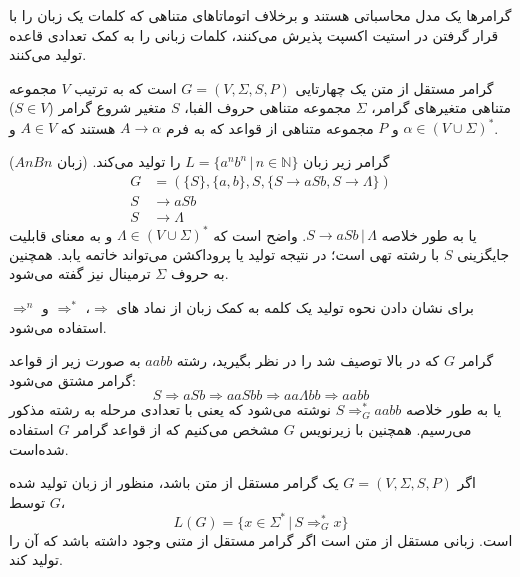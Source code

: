 \documentclass[main.tex]{subfiles}
\begin{document}
	گرامر‌ها
	 یک مدل محاسباتی هستند و برخلاف اتوماتا‌های متناهی که کلمات یک زبان را با قرار گرفتن در استیت اکسپت پذیرش می‌کنند، کلمات زبانی را به کمک تعدادی قاعده
	تولید می‌کنند.
	\begin{definition}
		گرامر مستقل از متن یک چهار‌تایی 
		$G = (V, \Sigma, S, P)$
		است که به ترتیب $V$ مجموعه متناهی متغیر‌های گرامر، 
		$\Sigma$
		مجموعه متناهی حروف الفبا، $S$ متغیر شروع گرامر ($S \in V$) و $P$ مجموعه متناهی از قواعد که به فرم 
		$A \rightarrow \alpha$
		هستند که 
		$A \in V$ 
		و
		$\alpha \in (V \cup \Sigma)^*$.
	\end{definition}
	
	\begin{example}
		گرامر زیر زبان 
		$L = \{a^nb^n \, | \, n \in \mathbb{N}\}$
		را تولید می‌کند. (زبان $ AnBn $)
		\begin{align*}
			G &= (\{S\}, \{a, b\}, S, \{S \rightarrow aSb, S \rightarrow \Lambda\}) \\
			S &\rightarrow aSb \\
			S &\rightarrow \Lambda
		\end{align*}
	یا به طور خلاصه
	$S \rightarrow aSb \, | \, \Lambda$.
	واضح است که 
	$\Lambda \in (V \cup \Sigma)^*$
	و به معنای قابلیت جایگزینی $S$ با رشته تهی است؛ در نتیجه تولید یا پروداکشن می‌تواند خاتمه یابد. همچنین به حروف 
	$\Sigma$
	ترمینال نیز گفته می‌شود.
	\end{example}
	
	برای نشان دادن نحوه تولید یک کلمه به کمک زبان از نماد های 
	$\Rightarrow$،
	$\Rightarrow^*$
	و
	$\Rightarrow^n$
	استفاده می‌شود.
	
	\begin{example}
		گرامر $G$ که در بالا توصیف شد را در نظر بگیرید، رشته 
		$aabb$
		به صورت زیر از قواعد گرامر مشتق
		 می‌شود:
		 $$S \Rightarrow aSb \Rightarrow aaSbb \Rightarrow aa\Lambda bb \Rightarrow aabb$$
		یا به طور خلاصه 
		$S \Rightarrow^{*}_G aabb$
		نوشته می‌شود که یعنی با تعدادی مرحله به رشته مذکور می‌رسیم. همچنین با زیرنویس $G$ مشخص می‌کنیم که از قواعد گرامر $G$ استفاده شده‌است.
	\end{example}
	
	\begin{definition}
	اگر 
	$G = (V, \Sigma, S, P)$
	یک 
	گرامر مستقل از متن باشد، منظور از زبان تولید شده توسط $G$، 
	$$L(G) = \{x \in \Sigma^* \, | \, S \Rightarrow^{*}_G x \}$$
	است. زبانی مستقل از متن است اگر گرامر مستقل از متنی وجود داشته باشد که آن را تولید کند.
	\end{definition}
	
\end{document}
